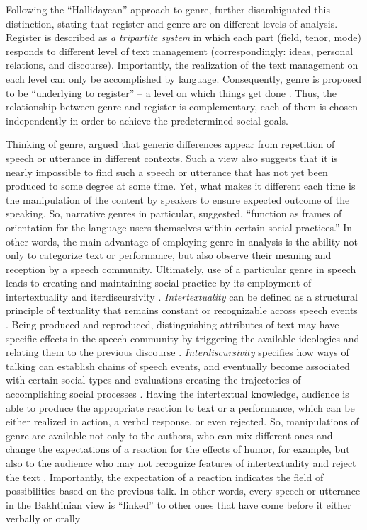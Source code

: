 \documentclass[12pt, draft]{article}
\begin{document}
Following the ``Hallidayean'' approach to genre, \textcite{swales1990} further disambiguated this distinction, stating that register and genre are on different levels of analysis. Register is described as \textit{a tripartite system} in which each part (field, tenor, mode) responds to different level of text management (correspondingly: ideas, personal relations, and discourse). Importantly, the realization of the text management on each level can only be accomplished by language. Consequently, genre is proposed to be ``underlying to register'' -- a level on which things get done \parencite[p. 40]{swales1990}. Thus, the relationship between genre and register is complementary, each of them is chosen independently in order to achieve the predetermined social goals.

Thinking of genre, \textcite{bakhtin1986} argued that generic differences appear from repetition of speech or utterance in different contexts. Such a view also suggests that it is nearly impossible to find such a speech or utterance that has not yet been produced to some degree at some time. Yet, what makes it different each time is the manipulation of the content by speakers to ensure expected outcome of the speaking. So, narrative genres in particular, \textcite[p. 181]{hyvarinen2015} suggested, ``function as frames of orientation for the language users themselves within certain social practices.'' In other words, the main advantage of employing genre in analysis is the ability not only to categorize text or performance, but also observe their meaning and reception by a speech community. Ultimately, use of a particular genre in speech leads to creating and maintaining social practice by its employment of intertextuality \parencite{briggs1992} and iterdiscursivity \parencite{wortham2015}. \textit{Intertextuality} can be defined as a structural principle of textuality that remains constant or recognizable across speech events \parencite{wortham2015}. Being produced and reproduced, distinguishing attributes of text may have specific effects in the speech community by triggering the available ideologies and relating them to the previous discourse \parencite{bakhtin1986}. \textit{Interdiscursivity} specifies how ways of talking can establish chains of speech events, and eventually become associated with certain social types and evaluations creating the trajectories of accomplishing social processes \parencite{agha2003}. Having the intertextual knowledge, audience is able to produce the appropriate reaction to text or a performance, which can be either realized in action, a verbal response, or even rejected. So, manipulations of genre are available not only to the authors, who can mix different ones and change the expectations of a reaction for the effects of humor, for example, but also to the audience who may not recognize features of intertextuality and reject the text \parencite{bax2011}. Importantly, the expectation of a reaction indicates the field of possibilities based on the previous talk. In other words, every speech or utterance in the Bakhtinian view is ``linked'' to other ones that have come before it either verbally or orally \parencite[p. 69]{bakhtin1986}
\end{document}
